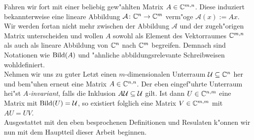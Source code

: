 Fahren wir fort mit einer beliebig gew"ahlten Matrix $A\in\mathbb{C}^{m,n}$. Diese induziert bekannterweise eine lineare Abbildung $\mathcal{A}\colon\mathbb{C}^n\to\mathbb{C}^{m}$ verm"oge $\mathcal{A}(x) := Ax$.
Wir werden fortan nicht mehr zwischen der Abbildung $\mathcal{A}$ und der zugeh"origen Matrix unterscheiden und wollen $A$ sowohl als Element des Vektorraumes $\mathbb{C}^{m,n}$
als auch als lineare Abbildung von $\mathbb{C}^n$ nach $\mathbb{C}^m$ begreifen. Demnach sind Notationen wie $\operatorname{Bild}(A)$ und "ahnliche abbildungsrelevante Schreibweisen wohldefiniert.\\

Nehmen wir uns zu guter Letzt einen $m$-dimensionalen Unterraum $\mathcal{U} \subseteq \mathbb{C}^n$ her und bem"uhen erneut eine Matrix $A\in\mathbb{C}^{n,n}$.
Der eben eingef"uhrte Unterraum hei"st \emph{$A$-invariant}, falls die Inklusion $A\mathcal{U}\subseteq\mathcal{U}$ gilt.
Ist dann $U\in\mathbb{C}^{n,m}$ eine Matrix mit $\operatorname{Bild}(U)=\mathcal{U}$, so existiert folglich eine Matrix $V\in\mathbb{C}^{m,m}$ mit $AU = UV$.\\

Ausgestattet mit den eben besprochenen Definitionen und Resulaten k"onnen wir nun mit dem Hauptteil dieser Arbeit beginnen.






